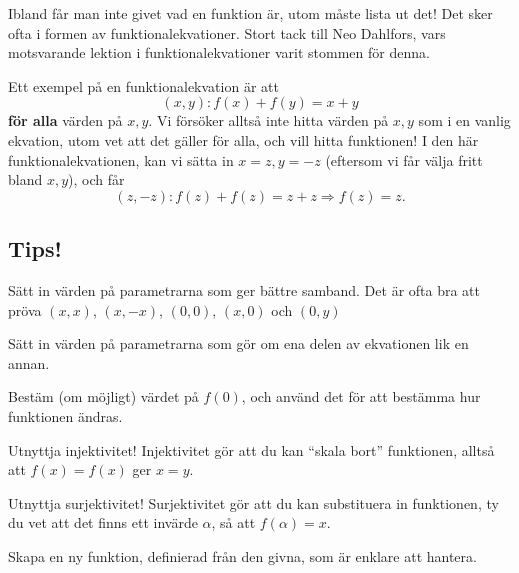 Ibland får man inte givet vad en funktion är, utom måste lista ut det! Det sker ofta i formen av funktionalekvationer. Stort tack till Neo Dahlfors, vars motsvarande lektion i funktionalekvationer varit stommen för denna.

\begin{exempel}
	Ett exempel på en funktionalekvation är att
	\[
		(x,y): f(x) + f(y) = x + y
	\]
	\textbf{för alla} värden på \(x, y\). Vi försöker alltså inte hitta värden på \(x, y\) som i en vanlig ekvation, utom vet att det gäller för alla, och vill hitta funktionen! 
	I den här funktionalekvationen, kan vi sätta in \(x=z, y=-z\) (eftersom vi får välja fritt bland \(x, y\)), och får
	\[
		(z, -z) : f(z) + f(z) = z + z \Rightarrow f(z) = z.
	\]
\end{exempel}

\subsection{Tips!} %
\begin{tips}[Substitution]
	Sätt in värden på parametrarna som ger bättre samband. Det är ofta bra att pröva \(\left(x, x\right)\), \((x, -x)\), \((0, 0)\), \((x, 0)\) och \((0, y)\) 
\end{tips}

\begin{tips}[Symmetri]
	Sätt in värden på parametrarna som gör om ena delen av ekvationen lik en annan.
\end{tips}

\begin{tips}[Bestäm \(f(0)\)]
	Bestäm (om möjligt) värdet på \(f(0)\), och använd det för att bestämma hur funktionen ändras.
\end{tips}

\begin{tips}
	Utnyttja injektivitet! Injektivitet gör att du kan ``skala bort'' funktionen, alltså att \(f(x) = f(x)\) ger \(x = y\).
\end{tips}

\begin{tips}
	Utnyttja surjektivitet! Surjektivitet gör att du kan substituera in funktionen, ty du vet att det finns ett invärde \(\alpha \), så att \(f(\alpha ) = x\).
\end{tips}

\begin{tips}
	Skapa en ny funktion, definierad från den givna, som är enklare att hantera.
\end{tips}


